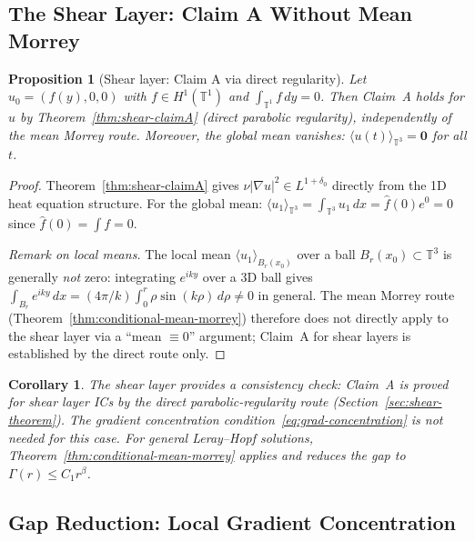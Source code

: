 \documentclass[11pt]{article}
\newtheorem{proposition}[theorem]{Proposition}
\newtheorem{corollary}[theorem]{Corollary}
\theoremstyle{definition}
\theoremstyle{remark}
\newcommand{\T}{\mathbb{T}}
\begin{document}
\subsection{The Shear Layer: Claim A Without Mean Morrey}

\begin{proposition}[Shear layer: Claim A via direct regularity]
\label{prop:shear-mean-zero}
  Let $u_0=(f(y),0,0)$ with $f\in H^1(\T^1)$ and $\int_{\T^1}f\,dy=0$.
  Then Claim~A holds for $u$ by Theorem~\ref{thm:shear-claimA} (direct parabolic
  regularity), independently of the mean Morrey route.
  Moreover, the global mean vanishes: $\langle u(t)\rangle_{\T^3}=\mathbf{0}$ for all $t$.
\end{proposition}

\begin{proof}
  Theorem~\ref{thm:shear-claimA} gives $\nu|\nabla u|^2\in L^{1+\delta_0}$ directly
  from the 1D heat equation structure.
  For the global mean: $\langle u_1\rangle_{\T^3}
  = \int_{\T^3}u_1\,dx = \hat{f}(0)e^{0}=0$ since $\hat{f}(0)=\int f=0$.

  \medskip\noindent
  \emph{Remark on local means.}
  The local mean $\langle u_1\rangle_{B_r(x_0)}$ over a ball $B_r(x_0)\subset\T^3$
  is generally \emph{not} zero: integrating $e^{iky}$ over a 3D ball gives
  $\int_{B_r} e^{iky}\,dx = (4\pi/k)\int_0^r\rho\sin(k\rho)\,d\rho \neq 0$
  in general.  The mean Morrey route (Theorem~\ref{thm:conditional-mean-morrey})
  therefore does not directly apply to the shear layer via a ``mean $\equiv 0$''
  argument; Claim~A for shear layers is established by the direct route only.
\end{proof}

\begin{corollary}
  The shear layer provides a consistency check:
  Claim~A is proved for shear layer ICs by the direct parabolic-regularity route
  (Section~\ref{sec:shear-theorem}).  The gradient concentration
  condition~\eqref{eq:grad-concentration} is not needed for this case.
  For general Leray--Hopf solutions, Theorem~\ref{thm:conditional-mean-morrey}
  applies and reduces the gap to $\Gamma(r)\leq C_1 r^\beta$.
\end{corollary}

\subsection{Gap Reduction: Local Gradient Concentration}
\end{document}
